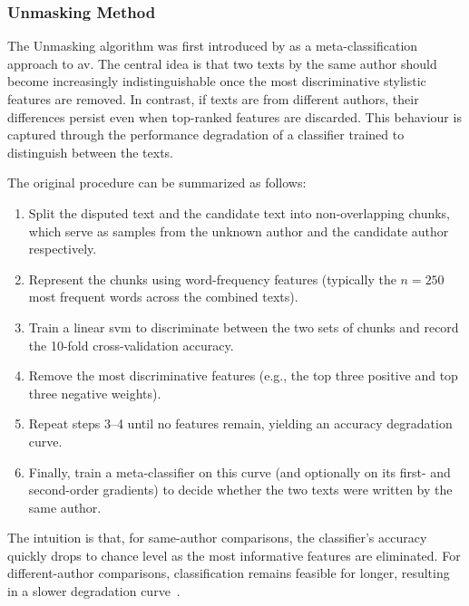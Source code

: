 \subsubsection{Unmasking Method}
\label{subsec:unmasking}

The Unmasking algorithm was first introduced by \citet{koppel_authorship_2004} as a meta-classification approach to \ac{av}. 
The central idea is that two texts by the same author should become increasingly indistinguishable once the most discriminative stylistic features are removed. 
In contrast, if texts are from different authors, their differences persist even when top-ranked features are discarded. 
This behaviour is captured through the performance degradation of a classifier trained to distinguish between the texts.

The original procedure can be summarized as follows:
\begin{enumerate}
    \item Split the disputed text and the candidate text into non-overlapping chunks, which serve as samples from the unknown author and the candidate author respectively. 
    \item Represent the chunks using word-frequency features (typically the $n=250$ most frequent words across the combined texts).
    \item Train a linear \ac{svm} to discriminate between the two sets of chunks and record the 10-fold cross-validation accuracy.
    \item Remove the most discriminative features (e.g., the top three positive and top three negative weights).  
    \item Repeat steps 3–4 until no features remain, yielding an accuracy degradation curve.  
    \item Finally, train a meta-classifier on this curve (and optionally on its first- and second-order gradients) to decide whether the two texts were written by the same author.  
\end{enumerate}
The intuition is that, for same-author comparisons, the classifier’s accuracy quickly drops to chance level as the most informative features are eliminated. 
For different-author comparisons, classification remains feasible for longer, resulting in a slower degradation curve~\citep{stein_intrinsic_2011,tyo_state_2022,bevendorff_divergence_based_2020,stamatatos_survey_2009}. 

